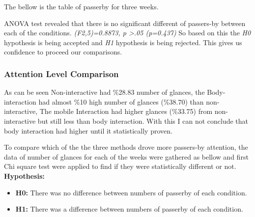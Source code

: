 The bellow is the table of passerby for three weeks.

\begin{table}[H]
\caption{Number of passerby in three weeks}
\label{tab:passerbyofthreeweeks}
\centering
{}
\end{table}

ANOVA test revealed that there is no significant different of passers-by between each of the conditions.
 \emph{(F2,5)=0.8873, p >.05 (p=0.437)}
 So based on this the \emph{H0} hypothesis is being accepted and \emph{H1} hypothesis is being rejected. This gives us confidence to proceed our comparisons.



\subsubsection {Attention Level Comparison}
As can be seen Non-interactive had \%28.83 number of glances, the Body-interaction had almost \%10 high number of glances (\%38.70) than non-interactive, The mobile Interaction had higher glances (\%33.75) from non-interactive but still less than body interaction.  With this I can not conclude that body interaction had higher until it statistically proven.

To compare which of the the three methods drove more passers-by attention, the data of number of glances for each of the weeks were gathered as bellow and first Chi square test were applied to find if they were statistically different or not.\\

\textbf{Hypothesis: }
\begin{itemize}
\item \textbf{H0:} There was no difference between numbers of passerby of each condition.
\item \textbf{H1:} There was a difference between numbers of passerby of each condition.
\end{itemize}

